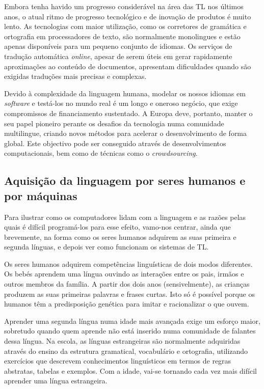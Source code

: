 \begin{multicols}{2}
 Embora tenha havido um progresso considerável na área das TL nos últimos anos, o atual ritmo de progresso tecnológico e de inovação de produtos é muito lento. As tecnologias com maior utilização, como os corretores de gramática e ortografia em processadores de texto, são normalmente monolingues e estão apenas disponíveis para um pequeno conjunto de idiomas. Os serviços de tradução automática \textit{online}, apesar de serem úteis em gerar rapidamente aproximações ao conteúdo de documentos, apresentam dificuldades quando são exigidas traduções mais precisas e complexas. 


Devido à complexidade da linguagem humana, modelar os nossos idiomas em \textit{software} e testá-los no mundo real é um longo e oneroso negócio, que exige compromissos de financiamento sustentado. A Europa deve, portanto, manter o seu papel pioneiro perante os desafios da tecnologia numa comunidade multilingue, criando novos métodos para acelerar o desenvolvimento de forma global. Este objectivo pode ser conseguido através de desenvolvimentos computacionais, bem como de técnicas como o \textit{crowdsourcing}.

\subsection{Aquisição da linguagem por seres humanos e por máquinas}

 Para ilustrar como os computadores lidam com a linguagem e as razões pelas quais é difícil pro\-gra\-má-los para esse efeito, vamo-nos centrar, ainda que brevemente, na forma como os seres humanos adquirem as suas primeira e segunda línguas, e depois ver como funcionam os sistemas de TL.

Os seres humanos adquirem competências linguísticas de dois modos diferentes. Os bebés aprendem uma língua ouvindo as interações entre os pais, irmãos e outros membros da família. A partir dos dois anos (sensivelmente), as crianças produzem as suas primeiras palavras e frases curtas. Isto só é possível porque os humanos têm a predisposição genética para imitar e racionalizar o que ouvem.


Aprender uma segunda língua numa idade mais avançada exige um esforço maior, sobretudo quando quem aprende não está inserido numa comunidade de falantes dessa língua. Na escola, as línguas estrangeiras são normalmente adquiridas através do ensino da estrutura gramatical, vocabulário e ortografia, utilizando exercícios que descrevem conhecimentos linguísticos em termos de regras abstratas, tabelas e exemplos. Com a idade, vai-se tornando cada vez mais difícil aprender uma língua estrangeira.


\end{multicols}
